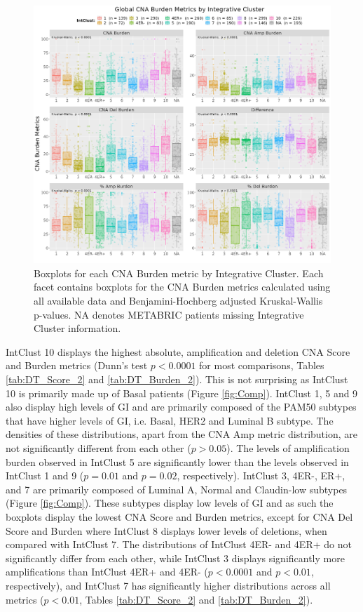 \begin{figure}[!ht]
\center
\includegraphics[width=1\textwidth]{../figures/Chapter_2/Global_CNA_Burden_Metrics_Across_IntClust.png}
\caption[Boxplots for each CNA Burden metric by Integrative Cluster.]{Boxplots for each CNA Burden metric by Integrative Cluster. Each facet contains boxplots for the CNA Burden metrics calculated using all available data and Benjamini-Hochberg adjusted Kruskal-Wallis p-values. NA denotes METABRIC patients missing Integrative Cluster information.}
\label{fig:CNA-Burden-Metric-Boxplots-IC}
\end{figure}

IntClust 10 displays the highest absolute, amplification and deletion CNA Score and Burden metrics (Dunn’s test $p < 0.0001$ for most comparisons, Tables \ref{tab:DT_Score_2} and \ref{tab:DT_Burden_2}). This is not surprising as IntClust 10 is primarily made up of Basal patients (Figure \ref{fig:Comp}). IntClust 1, 5 and 9 also display high levels of GI and are primarily composed of the PAM50 subtypes that have higher levels of GI, i.e. Basal, HER2 and Luminal B subtype. The densities of these distributions, apart from the CNA Amp metric distribution, are not significantly different from each other ($p > 0.05$). The levels of amplification burden observed in IntClust 5 are significantly lower than the levels observed in IntClust 1 and 9 ($p = 0.01$ and $p = 0.02$, respectively). IntClust 3, 4ER-, ER+, and 7 are primarily composed of Luminal A, Normal and Claudin-low subtypes (Figure \ref{fig:Comp}). These subtypes display low levels of GI and as such the boxplots display the lowest CNA Score and Burden metrics, except for CNA Del Score and Burden where IntClust 8 displays lower levels of deletions, when compared with IntClust 7. The distributions of IntClust 4ER- and 4ER+ do not significantly differ from each other, while IntClust 3 displays significantly more amplifications than IntClust 4ER+ and 4ER- ($p < 0.0001$ and $p < 0.01$, respectively), and IntClust 7 has significantly higher distributions across all metrics ($p < 0.01$, Tables \ref{tab:DT_Score_2} and \ref{tab:DT_Burden_2}).

